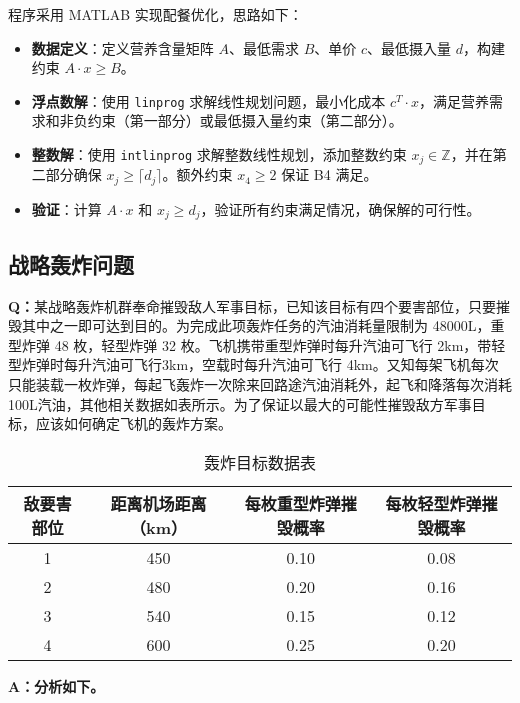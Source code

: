 程序采用 MATLAB 实现配餐优化，思路如下：
\begin{itemize}
    \item \textbf{数据定义}：定义营养含量矩阵 \( A \)、最低需求 \( B \)、单价 \( c \)、最低摄入量 \( d \)，构建约束 \( A \cdot x \geq B \)。
    \item \textbf{浮点数解}：使用 \texttt{linprog} 求解线性规划问题，最小化成本 \( c^T \cdot x \)，满足营养需求和非负约束（第一部分）或最低摄入量约束（第二部分）。
    \item \textbf{整数解}：使用 \texttt{intlinprog} 求解整数线性规划，添加整数约束 \( x_j \in \mathbb{Z} \)，并在第二部分确保 \( x_j \geq \lceil d_j \rceil \)。额外约束 \( x_4 \geq 2 \) 保证 B4 满足。
    \item \textbf{验证}：计算 \( A \cdot x \) 和 \( x_j \geq d_j \)，验证所有约束满足情况，确保解的可行性。
\end{itemize}


\subsection{战略轰炸问题}

\textbf{Q：}某战略轰炸机群奉命摧毁敌人军事目标，已知该目标有四个要害部位，只要摧毁其中之一即可达到目的。为完成此项轰炸任务的汽油消耗量限制为 48000L，重型炸弹 48 枚，轻型炸弹 32 枚。飞机携带重型炸弹时每升汽油可飞行 2km，带轻型炸弹时每升汽油可飞行3km，空载时每升汽油可飞行 4km。又知每架飞机每次只能装载一枚炸弹，每起飞轰炸一次除来回路途汽油消耗外，起飞和降落每次消耗 100L汽油，其他相关数据如表所示。为了保证以最大的可能性摧毁敌方军事目标，应该如何确定飞机的轰炸方案。

\begin{table}[H]
    \centering
    \renewcommand{\arraystretch}{1.5}
    \begin{tabular}{|c|c|c|c|}
    \hline
    \textbf{敌要害部位} & \textbf{距离机场距离（km）} & \textbf{每枚重型炸弹摧毁概率} & \textbf{每枚轻型炸弹摧毁概率} \\ \hline
    1 & 450 & 0.10 & 0.08 \\ \hline
    2 & 480 & 0.20 & 0.16 \\ \hline
    3 & 540 & 0.15 & 0.12 \\ \hline
    4 & 600 & 0.25 & 0.20 \\ \hline
    \end{tabular}
    \caption{轰炸目标数据表}
\end{table}

\textbf{A：分析如下。}

